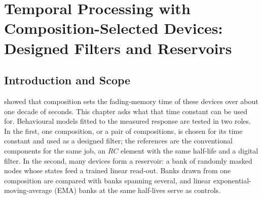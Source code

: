 \documentclass[12pt, twoside]{report}
\begin{document}
  \setcounter{chapter}{4}     %
\fi

\providecommand{\SY}{\textit{Super Yellow}}
\providecommand{\Hybrane}{\textit{Hybrane}}
\providecommand{\PEO}{PEO}
\providecommand{\TMPE}{TMPE}
\providecommand{\LiTf}{LiOTf}
\providecommand{\NaTf}{NaOTf}
\providecommand{\KTf}{KOTf}
\providecommand{\twoterminal}{two-terminal}
\providecommand{\WESAD}{\textsc{wesad}}
\providecommand{\NARMA}{NARMA-10}
\providecommand{\siTempRef}[1]{\ifdefined\thesismode\cref{#1}\else Appendix~D\fi}

\chapter[Temporal Processing with Composition-Selected Devices]{Temporal Processing with Composition-Selected Devices: Designed Filters and Reservoirs}\label{ch:temporal}

\section{Introduction and Scope}\label{sec:ch5_intro}

 showed that composition sets the fading-memory time of these devices over about one decade of seconds. This chapter asks what that time constant can be used for. Behavioural models fitted to the measured response are tested in two roles. In the first, one composition, or a pair of compositions, is chosen for its time constant and used as a designed filter; the references are the conventional components for the same job, an $RC$ element with the same half-life and a digital filter. In the second, many devices form a reservoir: a bank of randomly masked nodes whose states feed a trained linear read-out. Banks drawn from one composition are compared with banks spanning several, and linear exponential-moving-average (EMA) banks at the same half-lives serve as controls.
\end{document}

